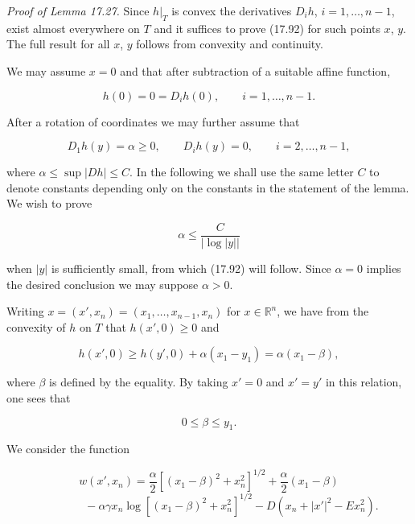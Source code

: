 \emph{Proof of Lemma 17.27.} Since $h|_T$ is convex the derivatives $D_i h$, $i=1,\ldots,n-1$, exist almost everywhere on $T$ and it suffices to prove (17.92) for such points $x$, $y$. The full result for all $x$, $y$ follows from convexity and continuity.

We may assume $x=0$ and that after subtraction of a suitable affine function,

\begin{equation}
\tag{17.93}
h(0)=0 = D_i h(0), \qquad i=1,\ldots,n-1.
\end{equation}


After a rotation of coordinates we may further assume that

\[
D_1 h(y) = \alpha \geq 0, \qquad D_i h(y) = 0, \qquad i = 2,\ldots,n-1,
\]

where $\alpha \leq \sup |Dh| \leq C$. In the following we shall use the same letter $C$ to denote constants depending only on the constants in the statement of the lemma. We wish to prove

\begin{equation}
\tag{17.94}
\alpha \leq \frac{C}{|\log |y||}
\end{equation}

when $|y|$ is sufficiently small, from which (17.92) will follow. Since $\alpha = 0$ implies the desired conclusion we may suppose $\alpha > 0$.

Writing $x = (x', x_n) = (x_1,\ldots,x_{n-1},x_n)$ for $x \in \mathbb{R}^n$, we have from the convexity of $h$ on $T$ that $h(x',0) \geq 0$ and

\begin{equation}
\tag{17.95}
h(x',0) \geq h(y',0) + \alpha(x_1 - y_1) = \alpha(x_1 - \beta),
\end{equation}

where $\beta$ is defined by the equality. By taking $x' = 0$ and $x' = y'$ in this relation, one sees that

\begin{equation}
\tag{17.96}
0 \leq \beta \leq y_1.
\end{equation}

We consider the function

\begin{equation}
\tag{17.97}
w(x',x_n) = \frac{\alpha}{2} \left[(x_1 - \beta)^2 + x_n^2\right]^{1/2} + \frac{\alpha}{2}(x_1 - \beta)
\end{equation}
\[
\qquad\qquad - \alpha \gamma x_n \log \left[(x_1 - \beta)^2 + x_n^2\right]^{1/2} - D(x_n + |x'|^2 - Ex_n^2).
\]

